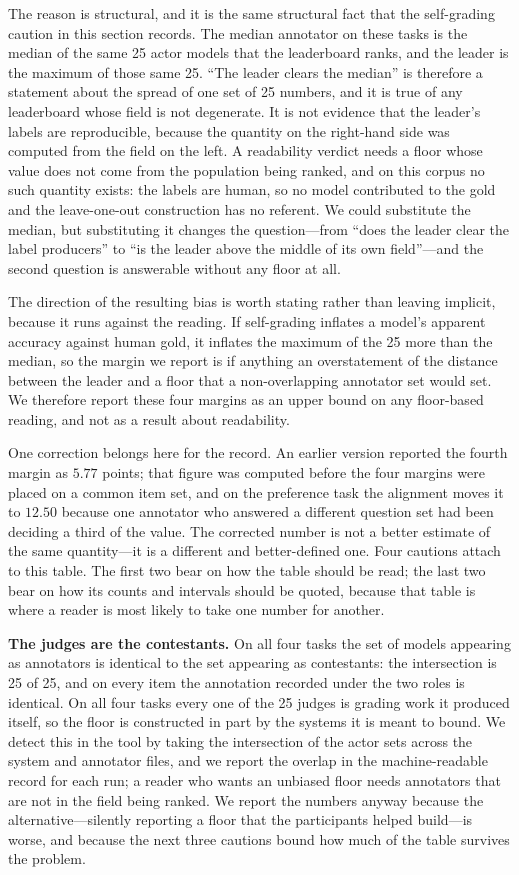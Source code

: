 \documentclass{article}
\begin{document}
The reason is structural, and it is the same structural fact that the self-grading caution in this section records. The median annotator on these tasks is the median of the same 25 actor models that the leaderboard ranks, and the leader is the maximum of those same 25. ``The leader clears the median'' is therefore a statement about the spread of one set of 25 numbers, and it is true of any leaderboard whose field is not degenerate. It is not evidence that the leader's labels are reproducible, because the quantity on the right-hand side was computed from the field on the left. A readability verdict needs a floor whose value does not come from the population being ranked, and on this corpus no such quantity exists: the labels are human, so no model contributed to the gold and the leave-one-out construction has no referent. We could substitute the median, but substituting it changes the question---from ``does the leader clear the label producers'' to ``is the leader above the middle of its own field''---and the second question is answerable without any floor at all.

The direction of the resulting bias is worth stating rather than leaving implicit, because it runs against the reading. If self-grading inflates a model's apparent accuracy against human gold, it inflates the maximum of the 25 more than the median, so the margin we report is if anything an overstatement of the distance between the leader and a floor that a non-overlapping annotator set would set. We therefore report these four margins as an upper bound on any floor-based reading, and not as a result about readability.

One correction belongs here for the record. An earlier version reported the fourth margin as $5.77$ points; that figure was computed before the four margins were placed on a common item set, and on the preference task the alignment moves it to $12.50$ because one annotator who answered a different question set had been deciding a third of the value. The corrected number is not a better estimate of the same quantity---it is a different and better-defined one.
Four cautions attach to this table. The first two bear on how the table should be read; the last two bear on how its counts and intervals should be quoted, because that table is where a reader is most likely to take one number for another.

\textbf{The judges are the contestants.} On all four tasks the set of models appearing as annotators is identical to the set appearing as contestants: the intersection is 25 of 25, and on every item the annotation recorded under the two roles is identical. On all four tasks every one of the 25 judges is grading work it produced itself, so the floor is constructed in part by the systems it is meant to bound. We detect this in the tool by taking the intersection of the actor sets across the system and annotator files, and we report the overlap in the machine-readable record for each run; a reader who wants an unbiased floor needs annotators that are not in the field being ranked. We report the numbers anyway because the alternative---silently reporting a floor that the participants helped build---is worse, and because the next three cautions bound how much of the table survives the problem.
\end{document}
